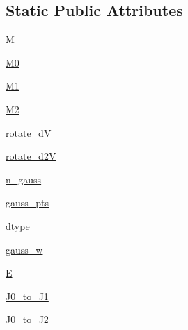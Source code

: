 \subsection*{Static Public Attributes}
\begin{DoxyCompactItemize}
\item 
\hyperlink{classmatplotlib_1_1tri_1_1triinterpolate_1_1__ReducedHCT__Element_a0b6a0d1d0e12df4c862cc9eb0df3ed92}{M}
\item 
\hyperlink{classmatplotlib_1_1tri_1_1triinterpolate_1_1__ReducedHCT__Element_a0be8745f48e255ee410e97c8c27e46c4}{M0}
\item 
\hyperlink{classmatplotlib_1_1tri_1_1triinterpolate_1_1__ReducedHCT__Element_a4f83d42a79a73a57f289d88ebb06d10f}{M1}
\item 
\hyperlink{classmatplotlib_1_1tri_1_1triinterpolate_1_1__ReducedHCT__Element_aca359ccdfc5a337767f26f550d897fb4}{M2}
\item 
\hyperlink{classmatplotlib_1_1tri_1_1triinterpolate_1_1__ReducedHCT__Element_a3b04c57be930bd60ca14e2161439befd}{rotate\+\_\+dV}
\item 
\hyperlink{classmatplotlib_1_1tri_1_1triinterpolate_1_1__ReducedHCT__Element_a3ffb880583f62b9af76b7d8f22919107}{rotate\+\_\+d2V}
\item 
\hyperlink{classmatplotlib_1_1tri_1_1triinterpolate_1_1__ReducedHCT__Element_aa32358cffb9f5cc7a1246e7397337c6e}{n\+\_\+gauss}
\item 
\hyperlink{classmatplotlib_1_1tri_1_1triinterpolate_1_1__ReducedHCT__Element_a4311fb2b118847f0646cd8e2e802a555}{gauss\+\_\+pts}
\item 
\hyperlink{classmatplotlib_1_1tri_1_1triinterpolate_1_1__ReducedHCT__Element_af91526793c04164e4dcc22d47c25f1d1}{dtype}
\item 
\hyperlink{classmatplotlib_1_1tri_1_1triinterpolate_1_1__ReducedHCT__Element_a646f087f8208b5ddb4f26f934653173b}{gauss\+\_\+w}
\item 
\hyperlink{classmatplotlib_1_1tri_1_1triinterpolate_1_1__ReducedHCT__Element_af2ee8b4aa1709a48a352953862b7b43e}{E}
\item 
\hyperlink{classmatplotlib_1_1tri_1_1triinterpolate_1_1__ReducedHCT__Element_a16477a2dae6de33e78dcb5e037b68cf8}{J0\+\_\+to\+\_\+\+J1}
\item 
\hyperlink{classmatplotlib_1_1tri_1_1triinterpolate_1_1__ReducedHCT__Element_a2711cfc85e607241d3ad7f88712dc9bb}{J0\+\_\+to\+\_\+\+J2}
\end{DoxyCompactItemize}


